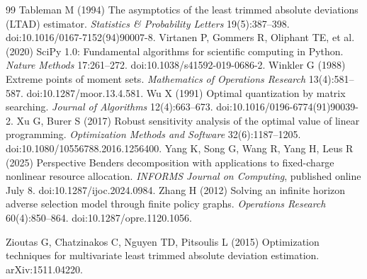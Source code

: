 \documentclass[11pt,letterpaper]{article}
\theoremstyle{definition}\newtheorem{remark}[theorem]{Remark}
\begin{document}
\begin{thebibliography}{99}
Tableman M (1994) The asymptotics of the least trimmed absolute deviations (LTAD) estimator. \emph{Statistics \& Probability Letters} 19(5):387--398. doi:10.1016/0167-7152(94)90007-8.
Virtanen P, Gommers R, Oliphant TE, et al. (2020) SciPy 1.0: Fundamental algorithms for scientific computing in Python. \emph{Nature Methods} 17:261--272. doi:10.1038/s41592-019-0686-2.
Winkler G (1988) Extreme points of moment sets. \emph{Mathematics of Operations Research} 13(4):581--587. doi:10.1287/moor.13.4.581.
Wu X (1991) Optimal quantization by matrix searching. \emph{Journal of Algorithms} 12(4):663--673. doi:10.1016/0196-6774(91)90039-2.
Xu G, Burer S (2017) Robust sensitivity analysis of the optimal value of linear programming. \emph{Optimization Methods and Software} 32(6):1187--1205. doi:10.1080/10556788.2016.1256400.
Yang K, Song G, Wang R, Yang H, Leus R (2025) Perspective Benders decomposition with applications to fixed-charge nonlinear resource allocation. \emph{INFORMS Journal on Computing}, published online July 8. doi:10.1287/ijoc.2024.0984.
Zhang H (2012) Solving an infinite horizon adverse selection model through finite policy graphs. \emph{Operations Research} 60(4):850--864. doi:10.1287/opre.1120.1056.


Zioutas G, Chatzinakos C, Nguyen TD, Pitsoulis L (2015) Optimization techniques for multivariate least trimmed absolute deviation estimation. arXiv:1511.04220.
\end{thebibliography}
\label{ec-refs-end}
\end{document}
